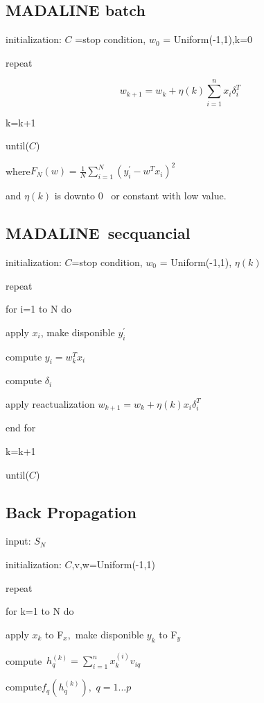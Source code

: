 \documentclass{article}
\begin{document}
\subsection{MADALINE batch}

initialization: $C$ =stop condition, $w_{0}$ = Uniform(-1,1),k=0

repeat

\[
w_{k+1}=w_{k}+\eta (k)\sum_{i=1}^{n}x_{i}\delta _{i}^{T} 
\]

\qquad k=k+1

until($C$)

where\qquad $F_{N}(w)=\frac{1}{N}\sum_{i=1}^{N}(y_{i}^{\prime
}-w^{T}x_{i})^{2}$

and $\eta (k)$ is downto 0 \ or constant with low value.

\subsection{MADALINE\ secquancial}

initialization: $C$=stop condition, $w_{0}$ = Uniform(-1,1), $\eta (k)$

repeat

\qquad for i=1 to N do

\qquad \qquad apply $x_{i}$, make disponible $y_{i}^{\prime }$

\qquad \qquad compute $y_{i}=w_{k}^{T}x_{i}$

\qquad \qquad compute $\delta _{i}$

\qquad \qquad apply reactualization $w_{k+1}=w_{k}+\eta (k)x_{i}\delta
_{i}^{T}$

\qquad end for

\qquad k=k+1

until($C$)

\subsection{Back Propagation}

input: $S_{N}$

initialization: $C$,v,w=Uniform(-1,1)

repeat

\qquad for k=1 to N do

\qquad \qquad apply $x_{k}$ to F$_{x},$ make disponible $y_{k}$ to F$_{y}$

\qquad \qquad compute\qquad\ $h_{q}^{(k)}=\sum_{i=1}^{n}x_{k}^{(i)}v_{iq}$

\qquad \qquad compute\qquad $f_{q}(h_{q}^{(k)}),\,\,q=1...p$
\end{document}
